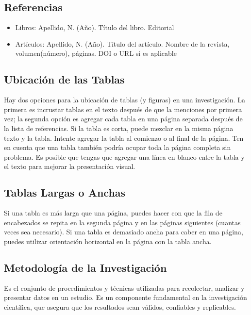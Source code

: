 \documentclass[12pt]{article}
\begin{document}
\subsection*{Referencias}
\begin{itemize}
    \item Libros: Apellido, N. (Año). Título del libro. Editorial
    \item Artículos: Apellido, N. (Año). Título del artículo. Nombre de la revista, volumen(número), páginas. DOI o URL si es aplicable
\end{itemize}

\subsection*{Ubicación de las Tablas}
Hay dos opciones para la ubicación de tablas (y figuras) en una investigación. La primera es incrustar tablas en el texto después de que la menciones por primera vez; la segunda opción es agregar cada tabla en una página separada después de la lista de referencias. Si la tabla es corta, puede mezclar en la misma página texto y la tabla. Intente agregar la tabla al comienzo o al final de la página. Ten en cuenta que una tabla también podría ocupar toda la página completa sin problema. Es posible que tengas que agregar una línea en blanco entre la tabla y el texto para mejorar la presentación visual.

\subsection*{Tablas Largas o Anchas}
Si una tabla es más larga que una página, puedes hacer con que la fila de encabezados se repita en la segunda página y en las páginas siguientes (cuantas veces sea necesario). Si una tabla es demasiado ancha para caber en una página, puedes utilizar orientación horizontal en la página con la tabla ancha.

\subsection*{Metodología de la Investigación}
Es el conjunto de procedimientos y técnicas utilizadas para recolectar, analizar y presentar datos en un estudio. Es un componente fundamental en la investigación científica, que asegura que los resultados sean válidos, confiables y replicables.
\end{document}
